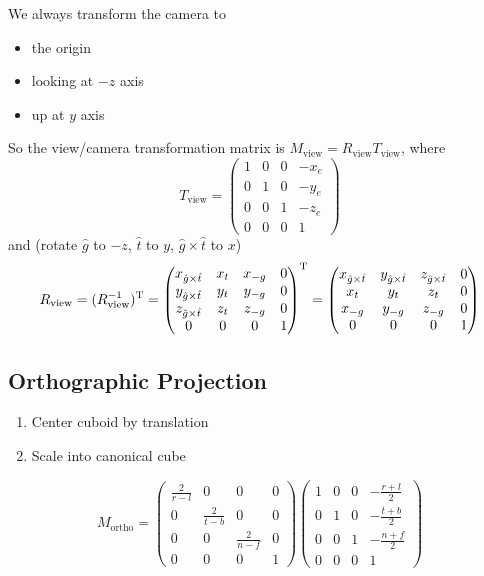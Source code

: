 We always transform the camera to
\begin{itemize}
    \item the origin
    \item looking at $-z$ axis
    \item up at $y$ axis
\end{itemize}

So the view/camera transformation matrix is $M_{\text{view}} = R_{\text{view}}T_{\text{view}}$, where
$$T_{\text{view}} = \begin{pmatrix}
    1 & 0 & 0 & -x_e \\
    0 & 1 & 0 & -y_e \\
    0 & 0 & 1 & -z_e \\
    0 & 0 & 0 & 1
\end{pmatrix}$$
and (rotate $\hat g$ to $-z$, $\hat t$ to $y$, $\hat g\times\hat t$ to $x$)
$$R_{\text{view}} = (R^{-1}_{\text{view}})^\mathrm{T} = 
    \begin{pmatrix}
        x_{\hat g\times\hat t} & x_t & x_{-g} & 0\\
        y_{\hat g\times\hat t} & y_t & y_{-g} & 0\\
        z_{\hat g\times\hat t} & z_t & z_{-g} & 0\\
        0 & 0 & 0 & 1
    \end{pmatrix}^\mathrm{T}
    = \begin{pmatrix}
        x_{\hat g\times\hat t} & y_{\hat g\times\hat t} & z_{\hat g\times\hat t} & 0\\
        x_t & y_t & z_t & 0\\
        x_{-g} & y_{-g} & z_{-g} & 0\\
        0 & 0 & 0 & 1
    \end{pmatrix}$$

\subsection{Orthographic Projection}

\begin{enumerate}
    \item Center cuboid by translation
    \item Scale into canonical cube
\end{enumerate}

$$M_{\text{ortho}} = \begin{pmatrix}
    \frac{2}{r - l} & 0 & 0 & 0 \\
    0 & \frac{2}{t - b} & 0 & 0 \\
    0 & 0 & \frac{2}{n - f} & 0 \\
    0 & 0 & 0 & 1
\end{pmatrix}\begin{pmatrix}
    1 & 0 & 0 & -\frac{r + l}{2} \\
    0 & 1 & 0 & -\frac{t + b}{2} \\
    0 & 0 & 1 & -\frac{n + f}{2} \\
    0 & 0 & 0 & 1
\end{pmatrix}$$

